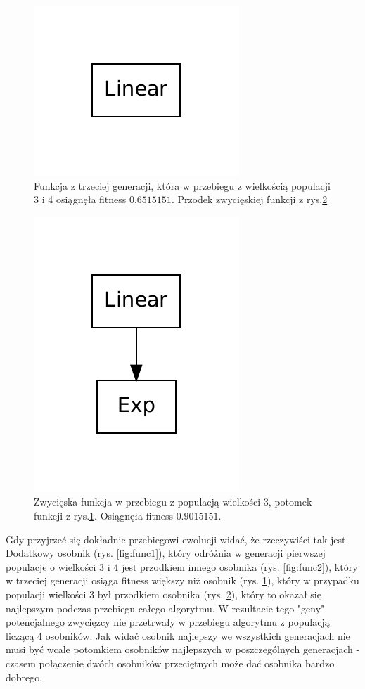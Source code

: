    	\begin{figure}
		\includegraphics[scale=0.60]{figures/functions/func3}
		\caption{Funkcja z trzeciej generacji, która w przebiegu z wielkością populacji 3 i 4 osiągnęła fitness $0.6515151$. Przodek zwycięskiej funkcji z rys.\ref{fig:func4}\label{fig:func3}}
	\end{figure}                 

    	\begin{figure}
		\includegraphics[scale=0.60]{figures/functions/func4}
		\caption{Zwycięska funkcja w przebiegu z populacją wielkości 3, potomek funkcji z rys.\ref{fig:func3}. Osiągnęła fitness $0.9015151$. \label{fig:func4}}
	\end{figure} 	
	
	 Gdy przyjrzeć się dokładnie przebiegowi ewolucji widać, że rzeczywiści tak jest. Dodatkowy osobnik (rys. \ref{fig:func1}), który odróżnia w generacji pierwszej populacje o wielkości 3 i 4 jest przodkiem innego osobnika (rys. \ref{fig:func2}), który w trzeciej generacji osiąga fitness większy niż osobnik (rys. \ref{fig:func3}), który w przypadku populacji wielkości 3 był przodkiem osobnika (rys. \ref{fig:func4}), który to okazał się najlepszym podczas przebiegu całego algorytmu. W rezultacie tego "geny" potencjalnego zwycięzcy nie przetrwały w przebiegu algorytmu z populacją liczącą 4 osobników. Jak widać osobnik najlepszy we wszystkich generacjach nie musi być wcale potomkiem osobników najlepszych w poszczególnych generacjach - czasem połączenie dwóch osobników przeciętnych może dać osobnika bardzo dobrego. 	

